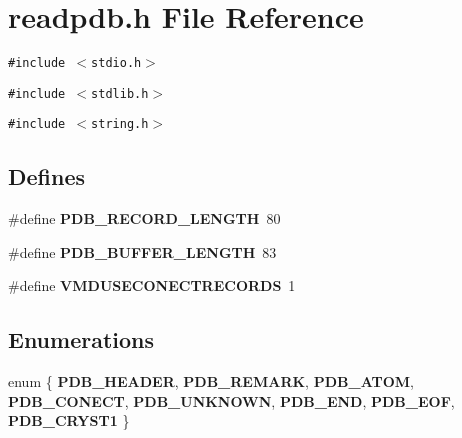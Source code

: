 \section{readpdb.h File Reference}
\label{readpdb_8h}
{\tt \#include $<$stdio.h$>$}\par
{\tt \#include $<$stdlib.h$>$}\par
{\tt \#include $<$string.h$>$}\par
\subsection*{Defines}
\begin{CompactItemize}
\item 
\#define {\bf PDB\_\-RECORD\_\-LENGTH}\ 80
\item 
\#define {\bf PDB\_\-BUFFER\_\-LENGTH}\ 83
\item 
\#define {\bf VMDUSECONECTRECORDS}\ 1
\end{CompactItemize}
\subsection*{Enumerations}
\begin{CompactItemize}
\item 
enum \{ {\bf PDB\_\-HEADER}, 
{\bf PDB\_\-REMARK}, 
{\bf PDB\_\-ATOM}, 
{\bf PDB\_\-CONECT}, 
{\bf PDB\_\-UNKNOWN}, 
{\bf PDB\_\-END}, 
{\bf PDB\_\-EOF}, 
{\bf PDB\_\-CRYST1}
 \}
\end{CompactItemize}
